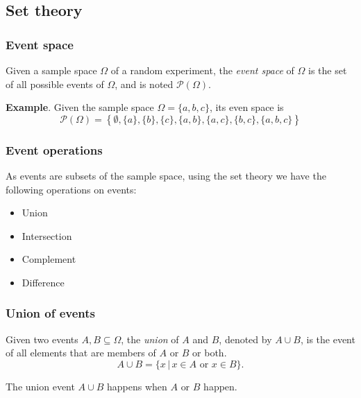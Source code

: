 \subsection{Set theory}

\begin{frame}
\frametitle{Event space}
\begin{definition} Given a sample space $\Omega$ of a random experiment, the \emph{event space} of
$\Omega$ is the set of all possible events of $\Omega$, and is noted $\mathcal{P}(\Omega)$.
\end{definition}

\textbf{Example}. Given the sample space $\Omega=\{a,b,c\}$, its even space is 
\[
\mathcal{P}(\Omega)=\left\{\emptyset, \{a\},\{b\},\{c\},\{a,b\},\{a,c\},\{b,c\},\{a,b,c\}\right\}
\]
\end{frame}


\begin{frame}
\frametitle{Event operations}
As events are subsets of the sample space, using the set theory we have the following operations on events:
\begin{itemize}
\item Union
\item Intersection
\item Complement
\item Difference
\end{itemize}
\end{frame}


\begin{frame}
\frametitle{Union of events}
\begin{definition}
Given two events $A,B\subseteq \Omega$, the \emph{union} of $A$ and $B$, denoted by $A\cup B$, is the event of
all elements that are members of $A$ or $B$ or both.
\[
A\cup B = \{x\,|\, x\in A\textrm{ or }x\in B\}.
\]
\end{definition}

\begin{center}

\end{center}
The union event $A\cup B$ happens when $A$ \alert{or} $B$ happen.
\end{frame}


